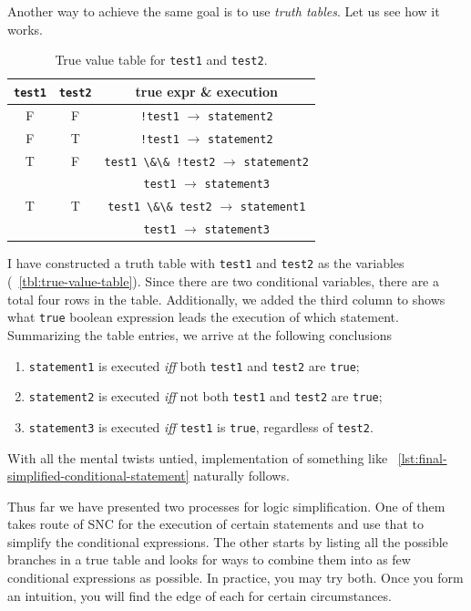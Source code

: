 \documentclass[oneside,11pt]{book}
\theoremstyle{definition}
\theoremstyle{remark}
\newcommand{\code}[1]{\mbox{\lstinline{#1}}}
\begin{document}
Another way to achieve the same goal is to use \emph{truth tables}.
Let us see how it works.
\begin{table}[h]
    \begin{center}
        \caption{True value table for \code{test1} and \code{test2}.
        \label{tbl:true-value-table}}
        \begin{tabular}{|c|c|c|}
            \hline
            \code{test1} & \code{test2} & true expr \& execution\\
            \hline
            F & F & \code{!test1} $\rightarrow$ \code{statement2} \\
            F & T & \code{!test1} $\rightarrow$ \code{statement2} \\
            T & F & \code{test1 \&\& !test2} $\rightarrow$ \code{statement2} \\
            & & \code{test1} $\rightarrow$ \code{statement3} \\
            T & T & \code{test1 \&\& test2} $\rightarrow$
            \code{statement1} \\
            & & \code{test1} $\rightarrow$ \code{statement3} \\
            \hline
        \end{tabular}
    \end{center}
\end{table}
I have constructed a truth table with \code{test1} and \code{test2} as the variables
(~\autoref{tbl:true-value-table}).
Since there are two conditional variables, there are a total four rows in the table.
Additionally, we added the third column to shows what \code{true} boolean expression leads
the execution of which statement.
Summarizing the table entries, we arrive at the following conclusions
\begin{enumerate}[label={\roman*:}]
    \item \code{statement1} is executed \emph{iff} both \code{test1} and \code{test2}
    are \code{true};
    \item \code{statement2} is executed \emph{iff} not both \code{test1} and \code{test2} are
    \code{true};
    \item \code{statement3} is executed \emph{iff} \code{test1} is \code{true}, regardless of
    \code{test2}.
\end{enumerate}
With all the mental twists untied, implementation of something like
~\autoref{lst:final-simplified-conditional-statement} naturally follows.


Thus far we have presented two processes for logic simplification.
One of them takes route of SNC for the execution of certain
statements and use that to simplify the conditional expressions.
The other starts by listing all the possible branches in a true table and looks for ways to
combine them into as few conditional expressions as possible.
In practice, you may try both.
Once you form an intuition, you will find the edge of each for certain circumstances.
\end{document}
